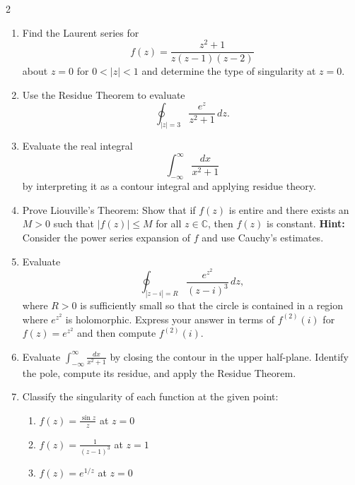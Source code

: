\begin{multicols}{2}
\begin{enumerate}
  \item Find the Laurent series for
  \[
  f(z)=\frac{z^2+1}{z(z-1)(z-2)}
  \]
  about \(z=0\) for \(0<|z|<1\) and determine the type of singularity at \(z=0\).
  
  \item Use the Residue Theorem to evaluate
  \[
  \oint_{|z|=3}\frac{e^z}{z^2+1}\,dz.
  \]
  
  \item Evaluate the real integral
  \[
  \int_{-\infty}^{\infty}\frac{dx}{x^2+1}
  \]
  by interpreting it as a contour integral and applying residue theory.
  
  \item Prove Liouville's Theorem: Show that if \(f(z)\) is entire and there exists an \(M>0\) such that \(|f(z)|\le M\) for all \(z\in\mathbb{C}\), then \(f(z)\) is constant.
      \textbf{Hint:} Consider the power series expansion of \(f\) and use Cauchy's estimates.
  
  \item Evaluate
  \[
  \oint_{|z-i|=R}\frac{e^{z^2}}{(z-i)^3}\,dz,
  \]
  where \(R>0\) is sufficiently small so that the circle is contained in a region where \(e^{z^2}\) is holomorphic. Express your answer in terms of \(f^{(2)}(i)\) for \(f(z)=e^{z^2}\) and then compute \(f^{(2)}(i)\).

\item Evaluate $\displaystyle\int_{-\infty}^{\infty} \frac{dx}{x^2 + 1}$ by closing the contour in the upper half-plane. Identify the pole, compute its residue, and apply the Residue Theorem.

\item Classify the singularity of each function at the given point:
\begin{enumerate}
\item $f(z) = \frac{\sin z}{z}$ at $z = 0$
\item $f(z) = \frac{1}{(z-1)^3}$ at $z = 1$
\item $f(z) = e^{1/z}$ at $z = 0$
\end{enumerate}

\end{enumerate}

\end{multicols}


